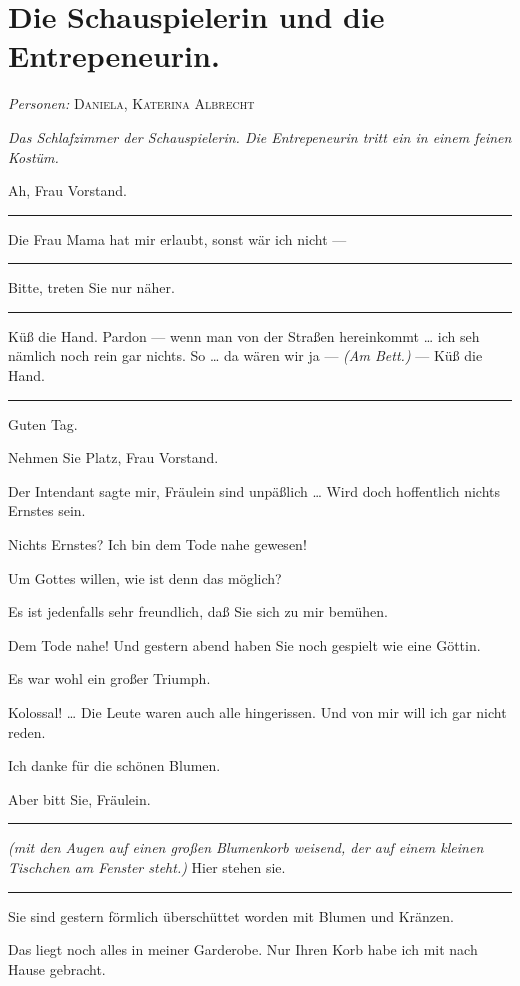 \documentclass[
	final,
	a4paper,
	ngerman,
	mpinclude = true, %
	twoside = true,
	open = right,
	cleardoublepage = plain,
	DIV = 13,
	BCOR = 1cm,
	titlepage = firstiscover,
	]{scrbook}
\newcommand{\scene}{\section}
\newcommand{\direction}[1]{\textit{(#1)}}
\newcommand{\setting}[1]{\vspace{-0.5\baselineskip}\centering\textit{#1}}
\newenvironment{deletion}{%
		\vspace{0.25\baselineskip}
		\hrule
		\vspace{0.25\baselineskip}
		\color{darkgray}
	}{
		\color{black}
		\vspace{0.25\baselineskip}
		\hrule 
		\vspace{0.25\baselineskip}
	}
\newcommand{\characterlist}[1]{{\begin{center}\textit{Personen:} #1\end{center}}}
\newcommand{\thecharacter}[1]{\textup{\textsc{#1}}\xspace}
\newcommand{\theschauspielerin}{\thecharacter{Daniela}}
\newcommand{\theentrepeneurin}{\thecharacter{Katerina Albrecht}}
\newcommand{\character}[1]{\item[#1:]}
\newcommand{\schauspielerin}{\character{\theschauspielerin}}
\newcommand{\entrepeneurin}{\character{\theentrepeneurin}}
\begin{document}
\scene{Die Schauspielerin und die Entrepeneurin.}
\characterlist{\theschauspielerin, \theentrepeneurin}
\setting{Das Schlafzimmer der Schauspielerin. Die Entrepeneurin tritt ein in einem feinen Kostüm.}
\begin{play}
	\schauspielerin
	Ah, Frau Vorstand.
	\begin{deletion}

	\entrepeneurin
	Die Frau Mama hat mir erlaubt, sonst wär ich nicht ---

	\schauspielerin
	\end{deletion}
	Bitte, treten Sie nur näher.

	\entrepeneurin
	\begin{deletion}
	Küß die Hand. Pardon --- wenn man von der Straßen hereinkommt \ldots{} ich seh nämlich noch rein gar nichts. So \ldots{} da wären wir ja --- \direction{Am Bett.} --- Küß die Hand.
	\end{deletion}
	Guten Tag.

	\schauspielerin
	Nehmen Sie Platz, Frau Vorstand.

	\entrepeneurin
	Der Intendant sagte mir, Fräulein sind unpäßlich \ldots{} Wird doch hoffentlich nichts Ernstes sein.

	\schauspielerin
	Nichts Ernstes? Ich bin dem Tode nahe gewesen!

	\entrepeneurin
	Um Gottes willen, wie ist denn das möglich?

	\schauspielerin
	Es ist jedenfalls sehr freundlich, daß Sie sich zu mir bemühen.

	\entrepeneurin
	Dem Tode nahe! Und gestern abend haben Sie noch gespielt wie eine Göttin.

	\schauspielerin
	Es war wohl ein großer Triumph.

	\entrepeneurin
	Kolossal! \ldots{} Die Leute waren auch alle hingerissen. Und von mir will ich gar nicht reden.

	\schauspielerin
	Ich danke für die schönen Blumen.

	\entrepeneurin
	Aber bitt Sie, Fräulein.
	\begin{deletion}

	\schauspielerin
	\direction{mit den Augen auf einen großen Blumenkorb weisend, der auf einem kleinen Tischchen am Fenster steht.} Hier stehen sie.

	\entrepeneurin
	\end{deletion}
	Sie sind gestern förmlich überschüttet worden mit Blumen und Kränzen.

	\schauspielerin
	Das liegt noch alles in meiner Garderobe. Nur Ihren Korb habe ich mit nach Hause gebracht.


\end{play}
\end{document}
